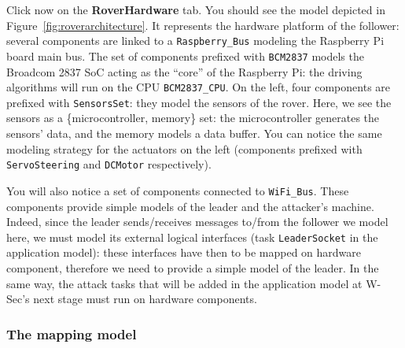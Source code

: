 \documentclass{article}
\begin{document}
Click now on the \textbf{RoverHardware} tab. You should see the model depicted in Figure~\ref{fig:roverarchitecture}. It represents the hardware platform of the follower: several components are linked to a \texttt{Raspberry\_Bus} modeling the Raspberry Pi board main bus. The set of components prefixed with \texttt{BCM2837} models the Broadcom 2837 SoC acting as the ``core'' of the Raspberry Pi: the driving algorithms will run on the CPU \texttt{BCM2837\_CPU}. On the left, four components are prefixed with \texttt{SensorsSet}: they model the sensors of the rover. Here, we see the sensors as a \{microcontroller, memory\} set: the microcontroller generates the sensors' data, and the memory models a data buffer. You can notice the same modeling strategy for the actuators on the left (components prefixed with \texttt{ServoSteering} and \texttt{DCMotor} respectively).

You will also notice a set of components connected to \texttt{WiFi\_Bus}. These components provide simple models of the leader and the attacker's machine. Indeed, since the leader sends/receives messages to/from the follower we model here, we must model its external logical interfaces (task \texttt{LeaderSocket} in the application model): these interfaces have then to be mapped on hardware component, therefore we need to provide a simple model of the leader. In the same way, the attack tasks that will be added in the application model at W-Sec's next stage must run on hardware components.

\subsubsection{The mapping model}
\end{document}
